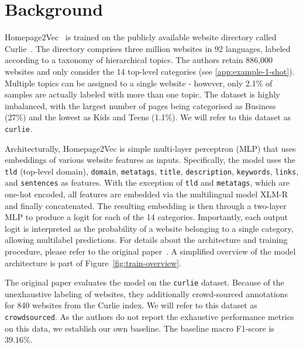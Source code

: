 \section{Background}\label{sec:background}

Homepage2Vec~\cite{homepage2vec} is trained on the publicly available website directory called Curlie~\cite{curlie}. The directory comprises three million websites in 92 languages, labeled according to a taxonomy of hierarchical topics. The authors retain 886,000 websites and only consider the 14 top-level categories (see \ref{app:example-1-shot}). Multiple topics can be assigned to a single website - however, only 2.1\% of samples are actually labeled with more than one topic. The dataset is highly imbalanced, with the largest number of pages being categorised as Business (27\%) and the lowest as Kids and Teens (1.1\%). We will refer to this dataset as \texttt{curlie}.


Architecturally, Homepage2Vec is simple multi-layer perceptron (MLP) that uses embeddings of various website features as inputs.
Specifically, the model uses the \texttt{tld} (top-level domain), \texttt{domain}, \texttt{metatags}, \texttt{title}, \texttt{description}, \texttt{keywords}, \texttt{links}, and \texttt{sentences} as features. With the exception of \texttt{tld} and \texttt{metatags}, which are one-hot encoded, all features are embedded via the multilingual model XLM-R~\cite{xmlr} and finally concatenated. The resulting embedding is then through a two-layer MLP to produce a logit for each of the 14 categories. Importantly, each output logit is interpreted as the probability of a website belonging to a single category, allowing multilabel predictions. For details about the architecture and training procedure, please refer to the original paper~\cite{homepage2vec}. A simplified overview of the model architecture is part of Figure~\ref{fig:train-overview}.

The original paper evaluates the model on the \texttt{curlie} dataset. Because of the unexhaustive labeling of websites, they additionally crowd-sourced annotations for 840 websites from the Curlie index. We will refer to this dataset as \texttt{crowdsourced}. As the authors do not report the exhaustive performance metrics on this data, we establish our own baseline. The baseline macro F1-score is $39.16\%$. 

